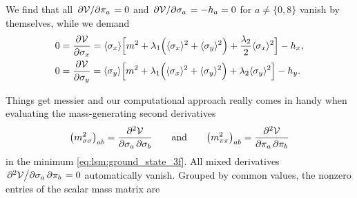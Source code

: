 We find that all $\pdv{\mathcal{V}}/{\pi_a}=0$
and $\pdv{\mathcal{V}}/{\sigma_a} = -h_a = 0$ for $a \neq \{0,8\}$ vanish by themselves,
while we demand
\begin{subequations}
\begin{align}
	0 &= \pdv{\mathcal{V}}{\sigma_x} = \langle \sigma_x \rangle \Big[ m^2 + \lambda_1 \Big( \langle \sigma_x \rangle^2 + \langle \sigma_y \rangle^2 \Big) + \frac{\lambda_2}{2} \langle \sigma_x \rangle^2 \Big] - h_x, \\
	0 &= \pdv{\mathcal{V}}{\sigma_y} = \langle \sigma_y \rangle \Big[ m^2 + \lambda_1 \Big( \langle \sigma_x \rangle^2 + \langle \sigma_y \rangle^2 \Big) + \lambda_2 \langle \sigma_y \rangle^2 \Big] - h_y.
\end{align}
\label{eq:lsm3f:symmetry_breakers}%
\end{subequations}

Things get messier and our computational approach really comes in handy when evaluating the mass-generating second derivatives
\begin{equation}
	\big(m^2_{\sigma\sigma}\big)_{ab} = \pdv{\mathcal{V}}{\sigma_a, \sigma_b}
	\qquad \text{and} \qquad
	\big(m^2_{\pi\pi}\big)_{ab}       = \pdv{\mathcal{V}}{\pi_a, \pi_b}
\end{equation}
in the minimum \eqref{eq:lsm:ground_state_3f}.
All mixed derivatives $\pdv{\mathcal{V}}/{\sigma_a,\pi_b} = 0$ automatically vanish.
Grouped by common values, the nonzero entries of the scalar mass matrix are
